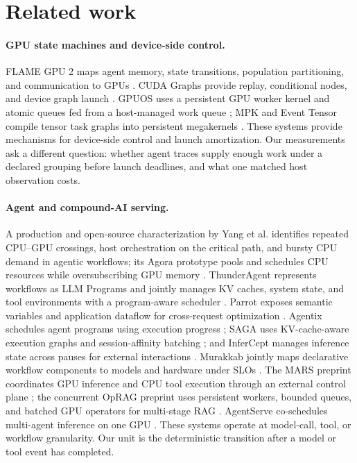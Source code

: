 \section{Related work}
\label{sec:related}

\paragraph{GPU state machines and device-side control.}
FLAME GPU 2 maps agent memory, state transitions, population partitioning, and
communication to GPUs \cite{richmond2023flamegpu2}. CUDA Graphs provide replay,
conditional nodes, and device graph launch \cite{nvidia2026cudaprogrammingguide}.
GPUOS uses a persistent GPU worker kernel and atomic queues fed from a
host-managed work queue \cite{yang2026gpuos}; MPK and
Event Tensor compile tensor task graphs into persistent megakernels
\cite{cheng2026mpk,jin2026eventtensor}. These systems provide mechanisms for
device-side control and launch amortization. Our measurements ask a different
question: whether agent traces supply enough work under a declared grouping
before launch deadlines, and what one matched host observation costs.

\paragraph{Agent and compound-AI serving.}
A production and open-source characterization by Yang et al. identifies
repeated CPU--GPU crossings, host orchestration on the critical path, and
bursty CPU demand in agentic workflows; its Agora prototype pools and schedules
CPU resources while oversubscribing GPU memory
\cite{yang2026agenticarchitecture}. ThunderAgent represents workflows as LLM
Programs and jointly manages KV caches, system state, and tool environments
with a program-aware scheduler \cite{kang2026thunderagent}.
Parrot exposes semantic variables and application dataflow for cross-request
optimization \cite{lin2024parrot}. Agentix schedules agent programs using
execution progress \cite{luo2026agentix}; SAGA uses KV-cache-aware execution
graphs and session-affinity batching \cite{guo2026saga}; and InferCept manages
inference state across pauses for external interactions
\cite{abhyankar2024infercept}. Murakkab jointly maps declarative workflow
components to models and hardware under SLOs \cite{chaudhry2026murakkab}. The
MARS preprint coordinates GPU inference and CPU tool execution through an
external control plane \cite{wang2026mars}; the concurrent OpRAG preprint uses
persistent workers, bounded queues, and batched GPU operators for multi-stage
RAG \cite{sarker2026oprag}.
AgentServe co-schedules multi-agent inference on one GPU
\cite{zhang2026agentserve}. These systems operate at model-call, tool, or
workflow granularity. Our unit is the deterministic transition after a model or
tool event has completed.

